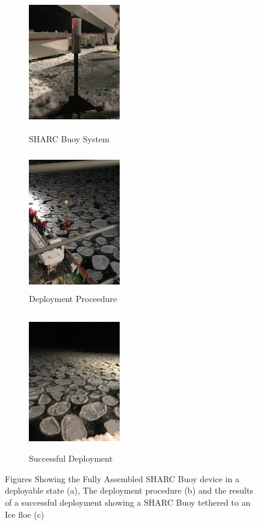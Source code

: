 \begin{figure}[H]
    \centering
    \begin{subfigure}[h]{0.3\textwidth}
    \includegraphics[width = 4cm,height = 6cm]{buoy.jpg}
    \caption{SHARC Buoy System}
    \end{subfigure}%
    \begin{subfigure}[h]{0.3\textwidth}
    \includegraphics[width = 4cm,height=6cm]{basket.jpg}
    \caption{Deployment Proceedure}
    \end{subfigure}%
    \begin{subfigure}[h]{0.3\textwidth}
    \includegraphics[width = 4cm,height=6cm]{deployment.jpg}
    \caption{Successful Deployment}
    \end{subfigure}%
    \caption{Figures Showing the  Fully Assembled SHARC Buoy device in a deployable state (a), The deployment procedure (b) and the results of a successful deployment showing a SHARC Buoy tethered to an Ice floe (c)}
    \label{fig:deployment}
\end{figure}
